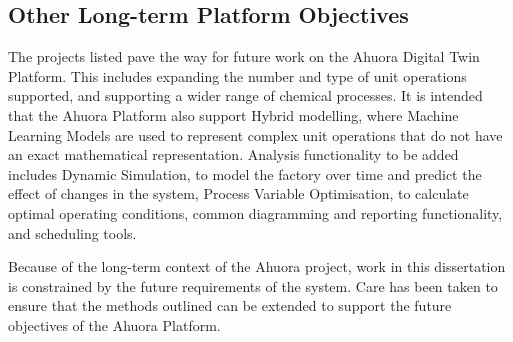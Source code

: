 \subsection{Other Long-term Platform Objectives}

The projects listed pave the way for future work on the Ahuora Digital Twin Platform. This includes expanding the number and type of unit operations supported, and supporting a wider range of chemical processes. It is intended that the Ahuora Platform also support Hybrid modelling, where Machine Learning Models are used to represent complex unit operations that do not have an exact mathematical representation. Analysis functionality to be added includes Dynamic Simulation, to model the factory over time and predict the effect of changes in the system, Process Variable Optimisation, to calculate optimal operating conditions, common diagramming and reporting functionality, and scheduling tools.

Because of the long-term context of the Ahuora project, work in this dissertation is constrained by the future requirements of the system. Care has been taken to ensure that the methods outlined can be extended to support the future objectives of the Ahuora Platform.
